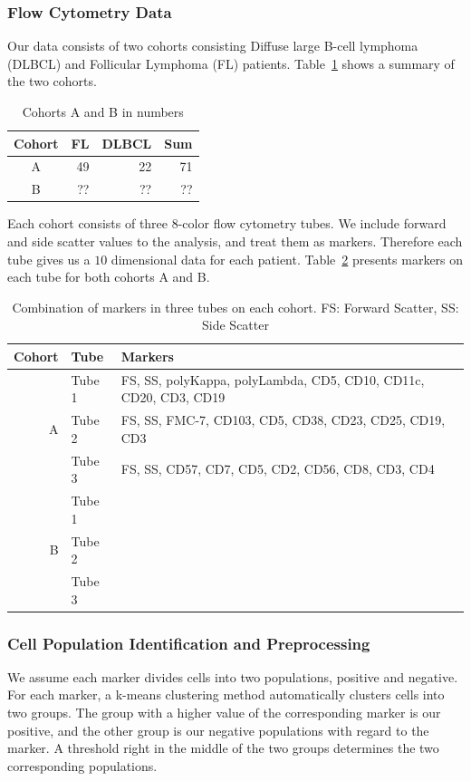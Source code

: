 \subsubsection{Flow Cytometry Data}
Our data consists of two cohorts consisting Diffuse large B-cell lymphoma (DLBCL) and Follicular Lymphoma (FL) patients. Table~\ref{tbl:fcs-qa-cohorts} shows a summary of the two cohorts.

\begin{table}[!ht]
  \centering
  \begin{tabular}{crrr}
    Cohort & FL & DLBCL & Sum \\ \hline
    A & 49 & 22 & 71 \\
    B & ?? & ?? & ??
  \end{tabular}
  \caption{Cohorts A and B in numbers}
  \label{tbl:fcs-qa-cohorts}
\end{table}

Each cohort consists of three 8-color flow cytometry tubes. We include forward and side scatter values to the analysis, and treat them as markers. Therefore each tube gives us a $10$ dimensional data for each patient. Table~\ref{tbl:fcs-qa-markers} presents markers on each tube for both cohorts A and B.

\begin{table}[!ht]
  \centering
  \begin{tabular}{rlm{7cm}}
    Cohort & Tube & Markers \\ \hline
    & Tube 1 & FS, SS, polyKappa, polyLambda, CD5, CD10, CD11c, CD20, CD3, CD19 \\
    A & Tube 2 & FS, SS, FMC-7, CD103, CD5, CD38, CD23, CD25, CD19, CD3 \\
    & Tube 3 & FS, SS, CD57, CD7, CD5, CD2, CD56, CD8, CD3, CD4 \\ \hline
     & Tube 1 &  \\
    B & Tube 2 &  \\
     & Tube 3 &  \\
  \end{tabular}
  \caption{Combination of markers in three tubes on each cohort. FS: Forward Scatter, SS: Side Scatter}
  \label{tbl:fcs-qa-markers}
\end{table}


\subsubsection{Cell Population Identification and Preprocessing}
We assume each marker divides cells into two populations, positive and negative. For each marker, a k-means clustering method automatically clusters cells into two groups. The group with a higher value of the corresponding marker is our positive, and the other group is our negative populations with regard to the marker. A threshold right in the middle of the two groups determines the two corresponding populations.

